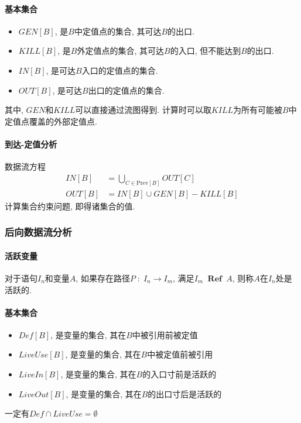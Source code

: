 \documentclass{ctexart}
\DeclareMathOperator{\Ref}{\;\mathbf{Ref}\;}
\begin{document}
\paragraph{基本集合}
    \begin{itemize}
        \item $GEN[B]$, 是$B$中定值点的集合, 其可达$B$的出口.
        \item $KILL[B]$, 是$B$外定值点的集合, 其可达$B$的入口, 但不能达到$B$的出口.
        \item $IN[B]$, 是可达$B$入口的定值点的集合.
        \item $OUT[B]$, 是可达$B$出口的定值点的集合.
    \end{itemize}
    其中, $GEN$和$KILL$可以直接通过流图得到.
    计算时可以取$KILL$为所有可能被$B$中定值点覆盖的外部定值点.
\paragraph{到达-定值分析}
    数据流方程
    \begin{align*}
        IN[B] &= \bigcup_{C \in \mathrm{Prev}[B]} OUT[C]\\
        OUT[B] &= IN[B]\cup GEN[B] - KILL[B]
    \end{align*}
    计算集合约束问题, 即得诸集合的值.

\subsubsection{后向数据流分析}
\paragraph{活跃变量} 
    对于语句$I_n$和变量$A$, 如果存在路径$P\;:\;I_n\to I_m$,
    满足$I_m \Ref A$, 则称$A$在$I_n$处是活跃的.
\paragraph{基本集合}
    \begin{itemize}
        \item $Def[B]$, 是变量的集合, 其在$B$中被引用前被定值
        \item $LiveUse[B]$, 是变量的集合, 其在$B$中被定值前被引用
        \item $LiveIn[B]$, 是变量的集合, 其在$B$的入口寸前是活跃的
        \item $LiveOut[B]$, 是变量的集合, 其在$B$的出口寸后是活跃的
    \end{itemize}
    一定有$Def \cap LiveUse = \emptyset$
\end{document}
